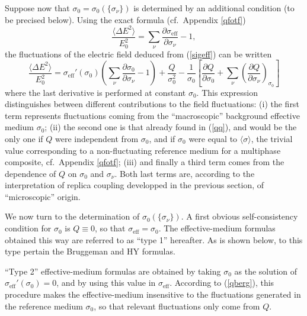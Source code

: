 Suppose now that $\sigma_0=\sigma_0(\{\sigma_\nu\})$ is determined 
by an additional condition (to be precised below). Using the exact 
formula \cite{BERG78}  (cf.\ Appendix \ref{qfotf})
\begin{equation}
\label{berg}
\frac{\langle\Delta E^2\rangle}{E_0^2}=\sum_\nu \frac{\partial
\sigma_{\text{eff}}}{\partial \sigma_\nu} -1,
\end{equation}
the fluctuations of the electric field deduced from (\ref{sigeff}) 
can be written
\begin{equation}
\label{qberg}
\frac{\langle\Delta
E^2\rangle}{E_0^2}=\sigma_{\text{eff}}'(\sigma_0)\left(\sum_\nu
\frac{\partial \sigma_0}{\partial
\sigma_\nu}-1\right)+\frac{Q}{\sigma_0^2}-\frac{1}{\sigma_0}
\left[\frac{\partial Q}{\partial
\sigma_0}+\sum_\nu\left(\frac{\partial Q}{\partial
\sigma_\nu}\right)_{\sigma_0}\right]
\end{equation}
where the last derivative is performed at constant $\sigma_0$.  This
expression distinguishes between different contributions to the field
fluctuations: (i) the first term represents fluctuations coming from
the ``macroscopic'' background effective medium $\sigma_0$; (ii) the
second one is that already found in (\ref{qq}), and would be the only
one if $Q$ were independent from $\sigma_0$, and if 
$\sigma_0$ were equal to $\langle\sigma\rangle$,
 the trivial value corresponding
to a non-fluctuating reference medium for a multiphase composite, cf.\
Appendix \ref{qfotf}; (iii) and finally a third
term comes from the dependence of $Q$ on $\sigma_0$ and
$\sigma_\nu$. Both last terms are, according to the interpretation of
replica coupling developped in the previous section, of
``microscopic'' origin.

We now turn to the determination of $\sigma_0(\{\sigma_\nu\})$. A 
first obvious self-consistency condition for $\sigma_0$ is $Q\equiv 0$, 
so that $\sigma_{\text{eff}}=\sigma_0$. The effective-medium formulas obtained 
this way are referred to as ``type 1'' hereafter. As is shown 
below, to this type pertain the Bruggeman and HY formulas.

``Type 2'' effective-medium formulas are obtained by taking $\sigma_0$
as the solution of $\sigma_{\text{eff}}'(\sigma_0)=0$, and by using
this value in $\sigma_{\text{eff}}$. According to (\ref{qberg}), this
procedure makes the effective-medium insensitive to the fluctuations
generated in the reference medium $\sigma_0$, so that relevant fluctuations
only come from $Q$.


